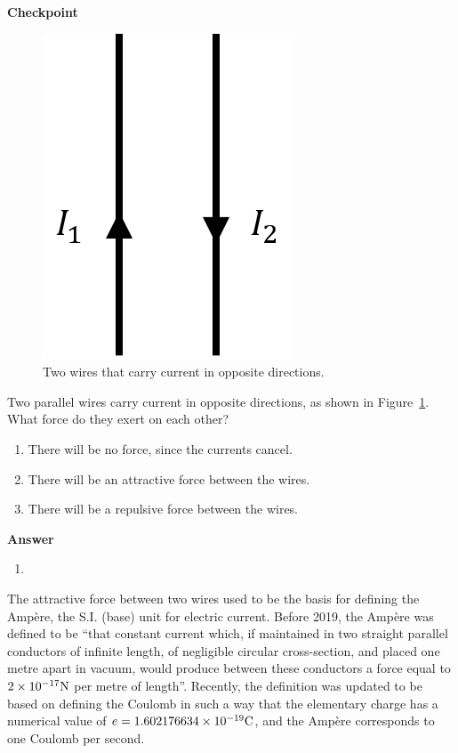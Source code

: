 \begin{framed}
\textbf{Checkpoint}\\
\begin{figure}[!htbp]
\centering
\includegraphics[width=0.2\linewidth]{files/oppositewires-db434c55df786bbeaad218aa318228be.png}
\caption[]{Two wires that carry current in opposite directions.}
\label{fig:magneticsource:oppositewires}
\end{figure}

Two parallel wires carry current in opposite directions, as shown in Figure~\ref{fig:magneticsource:oppositewires}. What force do they exert on each other?

\begin{enumerate}
\item There will be no force, since the currents cancel.
\item There will be an attractive force between the wires.
\item There will be a repulsive force between the wires.
\end{enumerate}

\begin{framed}
\textbf{Answer}\\
\begin{enumerate}[resume]
\item
\end{enumerate}
\end{framed}
\end{framed}

The attractive force between two wires used to be the basis for defining the Ampère, the S.I. (base) unit for electric current. Before 2019, the Ampère was defined to be ``that constant current which, if maintained in two straight parallel conductors of infinite length, of negligible circular cross-section, and placed one metre apart in vacuum, would produce between these conductors a force equal to $2\times 10^{ -17} {\rm N}$ per metre of length''. Recently, the definition was updated to be based on defining the Coulomb in such a way that the elementary charge has a numerical value of $e=1.602176634\times 10^{ -19} {\rm C}$, and the Ampère corresponds to one Coulomb per second.


